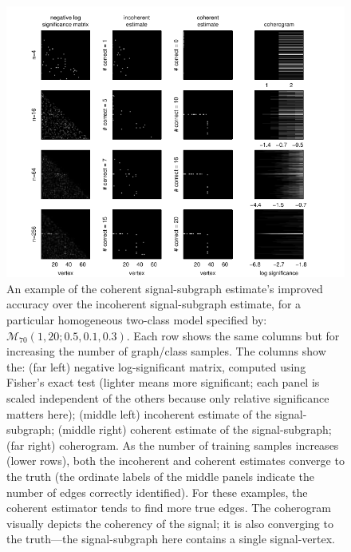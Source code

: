 \documentclass[10pt,journal,cspaper,compsoc]{IEEEtran}
\providecommand{\mc}[1]{\mathcal{#1}}
\begin{document}
\begin{figure}[tb!]
	\centering
		\includegraphics[width=1.0\linewidth]{demo_4x4_homo_V70_s20_p10_q30.pdf}
	\caption{An example of the coherent signal-subgraph estimate's improved accuracy over the incoherent signal-subgraph estimate, for a particular homogeneous two-class model specified by: $\mc{M}_{70}(1,20;0.5,0.1,0.3)$. Each row shows the same columns but for increasing the number of graph/class samples.  The columns show the: (far left) negative log-significant matrix, computed using Fisher's exact test (lighter means more significant; each panel is scaled independent of the others because only relative significance matters here); (middle left) incoherent estimate of the signal-subgraph; (middle right) coherent estimate of the signal-subgraph; (far right) coherogram.  As the number of training samples increases (lower rows), both the incoherent and coherent estimates converge to the truth (the ordinate labels of the middle panels indicate the number of edges correctly identified).  For these examples, the coherent estimator tends to find more true edges.  The coherogram visually depicts the coherency of the signal; it is also converging to the truth---the signal-subgraph here contains a single signal-vertex.}
	\label{fig:4x4}
\end{figure}
\end{document}
